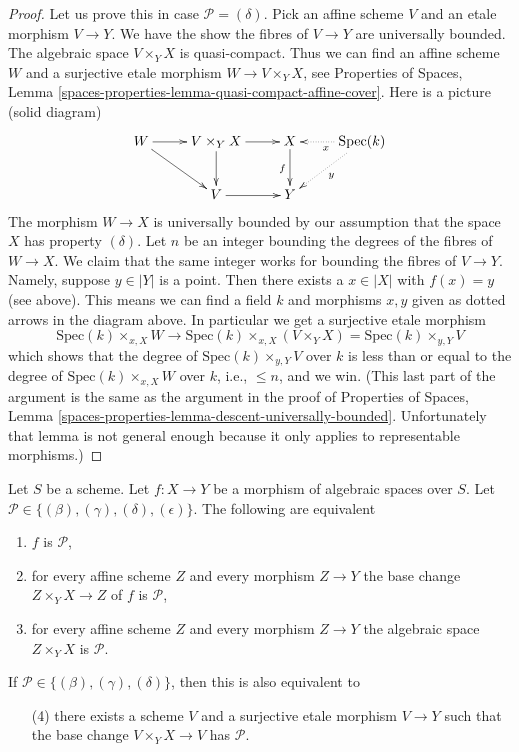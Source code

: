 \begin{proof}
\medskip\noindent
Let us prove this in case $\mathcal{P} = (\delta)$.
Pick an affine scheme $V$ and an etale morphism $V \to Y$.
We have the show the fibres of $V \to Y$ are universally bounded.
The algebraic space $V \times_Y X$ is quasi-compact.
Thus we can find an affine scheme $W$ and a surjective etale morphism
$W \to V \times_Y X$, see
Properties of Spaces,
Lemma \ref{spaces-properties-lemma-quasi-compact-affine-cover}.
Here is a picture (solid diagram)
$$
\xymatrix{
W \ar[r]  \ar[rd] &
V \times_Y X \ar[r] \ar[d] &
X \ar[d]_f & \text{Spec}(k) \ar@{..>}[l]^x \ar@{..>}[ld]^y \\
 & V \ar[r] & Y
}
$$
The morphism $W \to X$ is universally bounded by our assumption that
the space $X$ has property $(\delta)$. Let $n$ be an integer bounding
the degrees of the fibres of $W \to X$. We claim that the same integer
works for bounding the fibres of $V \to Y$. Namely, suppose $y \in |Y|$
is a point. Then there exists a $x \in |X|$ with $f(x) = y$ (see above).
This means we can find a field $k$ and morphisms $x, y$ given as dotted
arrows in the diagram above. In particular we get a surjective etale
morphism
$$
\text{Spec}(k) \times_{x, X} W
\to
\text{Spec}(k) \times_{x, X} (V \times_Y X) = \text{Spec}(k) \times_{y, Y} V
$$
which shows that the degree of $\text{Spec}(k) \times_{y, Y} V$ over $k$
is less than or equal to the degree of $\text{Spec}(k) \times_{x, X} W$
over $k$, i.e., $\leq n$, and we win. (This last part of the argument
is the same as the argument in the proof of
Properties of Spaces,
Lemma \ref{spaces-properties-lemma-descent-universally-bounded}. Unfortunately
that lemma is not general enough because it only applies to representable
morphisms.)
\end{proof}

\begin{lemma}
\label{lemma-characterize-relative-conditions}
Let $S$ be a scheme.
Let $f : X \to Y$ be a morphism of algebraic spaces over $S$.
Let $\mathcal{P} \in \{(\beta), (\gamma), (\delta), (\epsilon)\}$.
The following are equivalent
\begin{enumerate}
\item $f$ is $\mathcal{P}$,
\item for every affine scheme $Z$ and every morphism $Z \to Y$ the
base change $Z \times_Y X \to Z$ of $f$ is $\mathcal{P}$,
\item for every affine scheme $Z$ and every morphism $Z \to Y$ the
algebraic space $Z \times_Y X$ is $\mathcal{P}$.
\end{enumerate}
If $\mathcal{P} \in \{(\beta), (\gamma), (\delta)\}$, then this is also
equivalent to 
\begin{enumerate}
\item[(4)] there exists a scheme $V$ and a surjective etale morphism
$V \to Y$ such that the base change $V \times_Y X \to V$ has
$\mathcal{P}$.
\end{enumerate}
\end{lemma}

